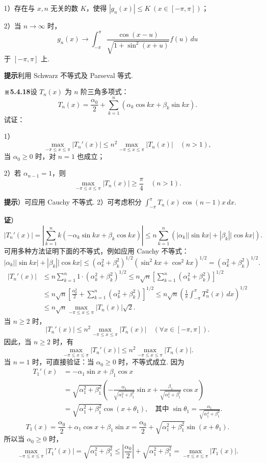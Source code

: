 \documentclass[UTF8,12pt,a4paper,fontset=fandol]{ctexart}
\begin{document}
1）存在与 $x,n$ 无关的数 $K$，使得 $|g_n(x)|\le K\ (x\in[-\pi,\pi])$；

2）当 $n\to\infty$ 时，
\[
  g_n(x)\to\int_{-\pi}^{\pi}
  \frac{\cos(x-u)}{\sqrt{1+\sin^2(x+u)}}f(u)\,du
\]
于 $[-\pi,\pi]$ 上.

\noindent\textbf{提示}\quad 利用 Schwarz 不等式及 Parseval 等式.

\noindent\textbf{※5.4.18}\quad 设 $T_n(x)$ 为 $n$ 阶三角多项式：
\[
  T_n(x)=\frac{\alpha_0}{2}+\sum_{k=1}^{n}(\alpha_k\cos kx+\beta_k\sin kx).
\]
试证：

1）
\[
  \max_{-\pi\le x\le\pi}|T_n'(x)|
  \le n^2\max_{-\pi\le x\le\pi}|T_n(x)|\quad(n>1),
\]
当 $\alpha_0\ge0$ 时，对 $n=1$ 也成立；

2）若 $\alpha_{n-1}=1$，则
\[
  \max_{-\pi\le x\le\pi}|T_n(x)|\ge\frac{\pi}{4}\quad(n>1).
\]

\noindent\textbf{提示}）可应用 Cauchy 不等式. 2）可考虑积分
$\displaystyle\int_{-\pi}^{\pi}T_n(x)\cos(n-1)x\,dx$.

\noindent\textbf{证}）
\[
  |T_n'(x)|=\left|\sum_{k=1}^{n}k(-\alpha_k\sin kx+\beta_k\cos kx)\right|
  \le n\sum_{k=1}^{n}(|\alpha_k||\sin kx|+|\beta_k||\cos kx|).
\]
可用多种方法证明下面的不等式，例如应用 Cauchy 不等式：
\[
  |\alpha_k||\sin kx|+|\beta_k||\cos kx|
  \le(\alpha_k^2+\beta_k^2)^{1/2}(\sin^2kx+\cos^2kx)^{1/2}
  =(\alpha_k^2+\beta_k^2)^{1/2}.
\]
\[
\begin{aligned}
|T_n'(x)|
&\le n\sum_{k=1}^{n}1\cdot(\alpha_k^2+\beta_k^2)^{1/2}
\le n\sqrt n\left[\sum_{k=1}^{n}(\alpha_k^2+\beta_k^2)\right]^{1/2}\\
&\le n\sqrt n\left[\frac{\alpha_0^2}{2}
+\sum_{k=1}^{n}(\alpha_k^2+\beta_k^2)\right]^{1/2}
\le n\sqrt n\left(\frac1\pi\int_{-\pi}^{\pi}T_n^2(x)\,dx\right)^{1/2}\\
&\le n\sqrt n\max_{-\pi\le x\le\pi}|T_n(x)|\sqrt2.
\end{aligned}
\]
当 $n\ge2$ 时，
\[
  |T_n'(x)|\le n^2\max_{-\pi\le x\le\pi}|T_n(x)|\quad(\forall x\in[-\pi,\pi]).
\]
因此，当 $n\ge2$ 时，有
\[
  \max_{-\pi\le x\le\pi}|T_n'(x)|
  \le n^2\max_{-\pi\le x\le\pi}|T_n(x)|.
\]
当 $n=1$ 时，可直接验证：当 $\alpha_0\ge0$ 时，不等式成立. 因为
\[
\begin{aligned}
T_1'(x)&=-\alpha_1\sin x+\beta_1\cos x\\
&=\sqrt{\alpha_1^2+\beta_1^2}
\left(-\frac{\alpha_1}{\sqrt{\alpha_1^2+\beta_1^2}}\sin x
+\frac{\beta_1}{\sqrt{\alpha_1^2+\beta_1^2}}\cos x\right)\\
&=\sqrt{\alpha_1^2+\beta_1^2}\cos(x+\theta_1),
\quad \text{其中 }\sin\theta_1=\frac{\alpha_1}{\sqrt{\alpha_1^2+\beta_1^2}}.
\end{aligned}
\]
\[
  T_1(x)=\frac{\alpha_0}{2}+\alpha_1\cos x+\beta_1\sin x
  =\frac{\alpha_0}{2}+\sqrt{\alpha_1^2+\beta_1^2}\sin(x+\theta_1).
\]
所以当 $\alpha_0\ge0$ 时，
\[
  \max_{-\pi\le x\le\pi}|T_1'(x)|
  =\sqrt{\alpha_1^2+\beta_1^2}
  \le\left|\frac{\alpha_0}{2}\right|+\sqrt{\alpha_1^2+\beta_1^2}
  =\max_{-\pi\le x\le\pi}|T_1(x)|.
\]
\end{document}
